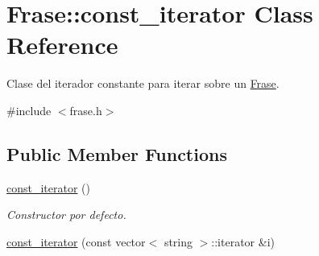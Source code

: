 \hypertarget{class_frase_1_1const__iterator}{}\section{Frase\+:\+:const\+\_\+iterator Class Reference}
\label{class_frase_1_1const__iterator}


Clase del iterador constante para iterar sobre un \hyperlink{class_frase}{Frase}.  




{\ttfamily \#include $<$frase.\+h$>$}

\subsection*{Public Member Functions}
\begin{DoxyCompactItemize}
\item 
\hyperlink{class_frase_1_1const__iterator_a21d9c41b9f2757077ed19a169693dafa}{const\+\_\+iterator} ()\hypertarget{class_frase_1_1const__iterator_a21d9c41b9f2757077ed19a169693dafa}{}\label{class_frase_1_1const__iterator_a21d9c41b9f2757077ed19a169693dafa}

\begin{DoxyCompactList}\small\item\em Constructor por defecto. \end{DoxyCompactList}\item 
\hyperlink{class_frase_1_1const__iterator_a20edeba3614e63e4954c0d72881fdaf7}{const\+\_\+iterator} (const vector$<$ string $>$\+::iterator \&i)\hypertarget{class_frase_1_1const__iterator_a20edeba3614e63e4954c0d72881fdaf7}{}\label{class_frase_1_1const__iterator_a20edeba3614e63e4954c0d72881fdaf7}


\end{DoxyCompactItemize}
